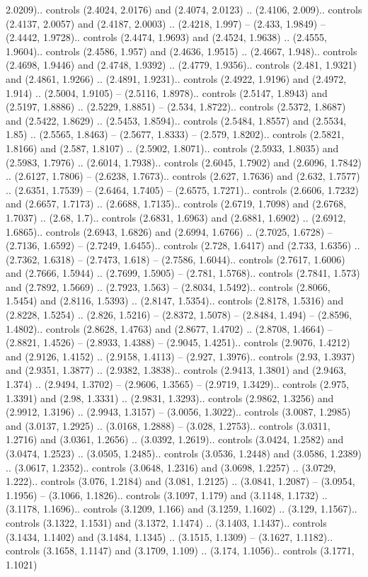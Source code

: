 2.0209).. controls (2.4024, 2.0176) and (2.4074, 2.0123) .. (2.4106, 2.009).. controls (2.4137, 2.0057) and (2.4187, 2.0003) .. (2.4218, 1.997) -- (2.433, 1.9849) -- (2.4442, 1.9728).. controls (2.4474, 1.9693) and (2.4524, 1.9638) .. (2.4555, 1.9604).. controls (2.4586, 1.957) and (2.4636, 1.9515) .. (2.4667, 1.948).. controls (2.4698, 1.9446) and (2.4748, 1.9392) .. (2.4779, 1.9356).. controls (2.481, 1.9321) and (2.4861, 1.9266) .. (2.4891, 1.9231).. controls (2.4922, 1.9196) and (2.4972, 1.914) .. (2.5004, 1.9105) -- (2.5116, 1.8978).. controls (2.5147, 1.8943) and (2.5197, 1.8886) .. (2.5229, 1.8851) -- (2.534, 1.8722).. controls (2.5372, 1.8687) and (2.5422, 1.8629) .. (2.5453, 1.8594).. controls (2.5484, 1.8557) and (2.5534, 1.85) .. (2.5565, 1.8463) -- (2.5677, 1.8333) -- (2.579, 1.8202).. controls (2.5821, 1.8166) and (2.587, 1.8107) .. (2.5902, 1.8071).. controls (2.5933, 1.8035) and (2.5983, 1.7976) .. (2.6014, 1.7938).. controls (2.6045, 1.7902) and (2.6096, 1.7842) .. (2.6127, 1.7806) -- (2.6238, 1.7673).. controls (2.627, 1.7636) and (2.632, 1.7577) .. (2.6351, 1.7539) -- (2.6464, 1.7405) -- (2.6575, 1.7271).. controls (2.6606, 1.7232) and (2.6657, 1.7173) .. (2.6688, 1.7135).. controls (2.6719, 1.7098) and (2.6768, 1.7037) .. (2.68, 1.7).. controls (2.6831, 1.6963) and (2.6881, 1.6902) .. (2.6912, 1.6865).. controls (2.6943, 1.6826) and (2.6994, 1.6766) .. (2.7025, 1.6728) -- (2.7136, 1.6592) -- (2.7249, 1.6455).. controls (2.728, 1.6417) and (2.733, 1.6356) .. (2.7362, 1.6318) -- (2.7473, 1.618) -- (2.7586, 1.6044).. controls (2.7617, 1.6006) and (2.7666, 1.5944) .. (2.7699, 1.5905) -- (2.781, 1.5768).. controls (2.7841, 1.573) and (2.7892, 1.5669) .. (2.7923, 1.563) -- (2.8034, 1.5492).. controls (2.8066, 1.5454) and (2.8116, 1.5393) .. (2.8147, 1.5354).. controls (2.8178, 1.5316) and (2.8228, 1.5254) .. (2.826, 1.5216) -- (2.8372, 1.5078) -- (2.8484, 1.494) -- (2.8596, 1.4802).. controls (2.8628, 1.4763) and (2.8677, 1.4702) .. (2.8708, 1.4664) -- (2.8821, 1.4526) -- (2.8933, 1.4388) -- (2.9045, 1.4251).. controls (2.9076, 1.4212) and (2.9126, 1.4152) .. (2.9158, 1.4113) -- (2.927, 1.3976).. controls (2.93, 1.3937) and (2.9351, 1.3877) .. (2.9382, 1.3838).. controls (2.9413, 1.3801) and (2.9463, 1.374) .. (2.9494, 1.3702) -- (2.9606, 1.3565) -- (2.9719, 1.3429).. controls (2.975, 1.3391) and (2.98, 1.3331) .. (2.9831, 1.3293).. controls (2.9862, 1.3256) and (2.9912, 1.3196) .. (2.9943, 1.3157) -- (3.0056, 1.3022).. controls (3.0087, 1.2985) and (3.0137, 1.2925) .. (3.0168, 1.2888) -- (3.028, 1.2753).. controls (3.0311, 1.2716) and (3.0361, 1.2656) .. (3.0392, 1.2619).. controls (3.0424, 1.2582) and (3.0474, 1.2523) .. (3.0505, 1.2485).. controls (3.0536, 1.2448) and (3.0586, 1.2389) .. (3.0617, 1.2352).. controls (3.0648, 1.2316) and (3.0698, 1.2257) .. (3.0729, 1.222).. controls (3.076, 1.2184) and (3.081, 1.2125) .. (3.0841, 1.2087) -- (3.0954, 1.1956) -- (3.1066, 1.1826).. controls (3.1097, 1.179) and (3.1148, 1.1732) .. (3.1178, 1.1696).. controls (3.1209, 1.166) and (3.1259, 1.1602) .. (3.129, 1.1567).. controls (3.1322, 1.1531) and (3.1372, 1.1474) .. (3.1403, 1.1437).. controls (3.1434, 1.1402) and (3.1484, 1.1345) .. (3.1515, 1.1309) -- (3.1627, 1.1182).. controls (3.1658, 1.1147) and (3.1709, 1.109) .. (3.174, 1.1056).. controls (3.1771, 1.1021) 